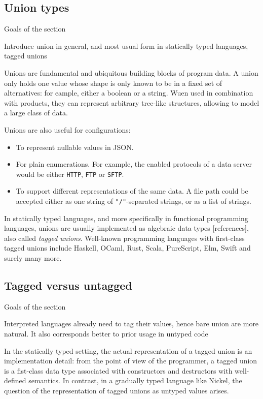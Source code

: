 \documentclass{article}
\begin{document}
\subsection{Union types}
{\color{red}Goals of the section

Introduce union in general, and most usual form in statically typed languages, tagged unions\vspace{0.5cm}}

Unions are fundamental and ubiquitous building blocks of program data. A union
only holds one value whose shape is only known to be in a fixed set of
alternatives: for eample, either a boolean or a string. Wuen used in combination
with products, they can represent arbitrary tree-like structures, allowing to
model a large class of data.

Unions are also useful for configurations:
\begin{itemize}
    \item To represent nullable values in JSON.
    \item For plain enumerations. For example, the enabled protocols of a data server
        would be either \lstinline+HTTP+, \lstinline+FTP+ or \lstinline+SFTP+.
    \item To support different representations of the same data. A file path could be
        accepted either as one string of \lstinline+"/"+-separated strings, or
        as a list of strings.
\end{itemize}

In statically typed languages, and more specifically in functional programming
languages, unions are usually implemented as algebraic data types [references],
also called \emph{tagged unions}. Well-known programming languages with
first-class tagged unions include Haskell, OCaml, Rust, Scala, PureScript, Elm,
Swift and surely many more.

\subsection{Tagged versus untagged}
{\color{red}Goals of the section

Interpreted languages already need to tag their values, hence bare union are more natural.
It also corresponds better to prior usage in untyped code\vspace{0.5cm}}

In the statically typed setting, the actual representation of a tagged union is
an implementation detail: from the point of view of the programmer, a tagged
union is a fist-class data type associated with constructors and destructors
with well-defined semantics. In contrast, in a gradually typed language like
Nickel, the question of the representation of tagged unions as untyped values
arises.
\end{document}
